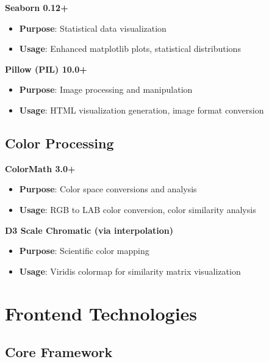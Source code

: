 \textbf{Seaborn 0.12+}
\begin{itemize}
    \item \textbf{Purpose}: Statistical data visualization
    \item \textbf{Usage}: Enhanced matplotlib plots, statistical distributions
\end{itemize}

\textbf{Pillow (PIL) 10.0+}
\begin{itemize}
    \item \textbf{Purpose}: Image processing and manipulation
    \item \textbf{Usage}: HTML visualization generation, image format conversion
\end{itemize}

\subsection{Color Processing}
\label{subsec:color-processing}

\textbf{ColorMath 3.0+}
\begin{itemize}
    \item \textbf{Purpose}: Color space conversions and analysis
    \item \textbf{Usage}: RGB to LAB color conversion, color similarity analysis
\end{itemize}

\textbf{D3 Scale Chromatic (via interpolation)}
\begin{itemize}
    \item \textbf{Purpose}: Scientific color mapping
    \item \textbf{Usage}: Viridis colormap for similarity matrix visualization
\end{itemize}

\section{Frontend Technologies}
\label{sec:frontend-tech}

\subsection{Core Framework}
\label{subsec:react-framework}

